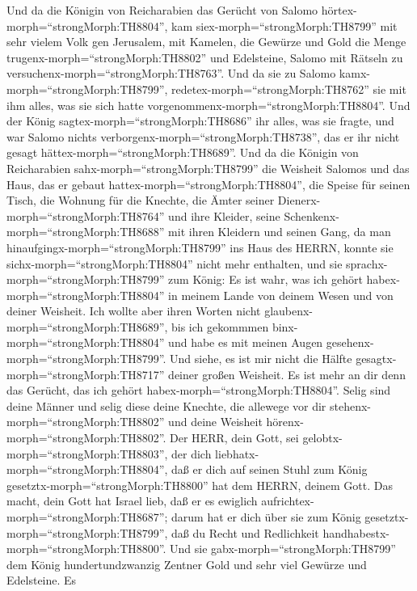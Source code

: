  Und da die Königin von Reicharabien das Gerücht von Salomo
hörtex-morph=``strongMorph:TH8804'', kam
siex-morph=``strongMorph:TH8799'' mit sehr vielem Volk gen Jerusalem,
mit Kamelen, die Gewürze und Gold die Menge
trugenx-morph=``strongMorph:TH8802'' und Edelsteine, Salomo mit Rätseln
zu versuchenx-morph=``strongMorph:TH8763''. Und da sie zu Salomo
kamx-morph=``strongMorph:TH8799'', redetex-morph=``strongMorph:TH8762''
sie mit ihm alles, was sie sich hatte
vorgenommenx-morph=``strongMorph:TH8804''.  Und der König
sagtex-morph=``strongMorph:TH8686'' ihr alles, was sie fragte, und war
Salomo nichts verborgenx-morph=``strongMorph:TH8738'', das er ihr nicht
gesagt hättex-morph=``strongMorph:TH8689''.  Und da die
Königin von Reicharabien sahx-morph=``strongMorph:TH8799'' die Weisheit
Salomos und das Haus, das er gebaut hattex-morph=``strongMorph:TH8804'',
 die Speise für seinen Tisch, die Wohnung für die Knechte,
die Ämter seiner Dienerx-morph=``strongMorph:TH8764'' und ihre Kleider,
seine Schenkenx-morph=``strongMorph:TH8688'' mit ihren Kleidern und
seinen Gang, da man hinaufgingx-morph=``strongMorph:TH8799'' ins Haus
des HERRN, konnte sie sichx-morph=``strongMorph:TH8804'' nicht mehr
enthalten,  und sie sprachx-morph=``strongMorph:TH8799'' zum
König: Es ist wahr, was ich gehört habex-morph=``strongMorph:TH8804'' in
meinem Lande von deinem Wesen und von deiner Weisheit.  Ich
wollte aber ihren Worten nicht glaubenx-morph=``strongMorph:TH8689'',
bis ich gekommmen binx-morph=``strongMorph:TH8804'' und habe es mit
meinen Augen gesehenx-morph=``strongMorph:TH8799''. Und siehe, es ist
mir nicht die Hälfte gesagtx-morph=``strongMorph:TH8717'' deiner großen
Weisheit. Es ist mehr an dir denn das Gerücht, das ich gehört
habex-morph=``strongMorph:TH8804''.  Selig sind deine Männer
und selig diese deine Knechte, die allewege vor dir
stehenx-morph=``strongMorph:TH8802'' und deine Weisheit
hörenx-morph=``strongMorph:TH8802''.  Der HERR, dein Gott,
sei gelobtx-morph=``strongMorph:TH8803'', der dich
liebhatx-morph=``strongMorph:TH8804'', daß er dich auf seinen Stuhl zum
König gesetztx-morph=``strongMorph:TH8800'' hat dem HERRN, deinem Gott.
Das macht, dein Gott hat Israel lieb, daß er es ewiglich
aufrichtex-morph=``strongMorph:TH8687''; darum hat er dich über sie zum
König gesetztx-morph=``strongMorph:TH8799'', daß du Recht und
Redlichkeit handhabestx-morph=``strongMorph:TH8800''.  Und
sie gabx-morph=``strongMorph:TH8799'' dem König hundertundzwanzig
Zentner Gold und sehr viel Gewürze und Edelsteine. Es
